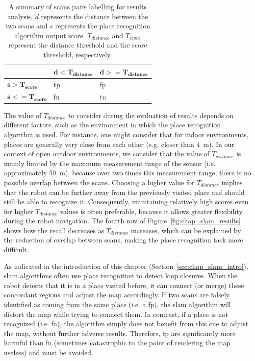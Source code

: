 \begin{table}
    \centering
    \begin{tabular}{@{}l|ll@{}}
        \toprule
                                  & $\mathbf{d < T_{distance}}$ & $\mathbf{d >= T_{distance}}$ \\
        \hline
        $\mathbf{s > T_{score}}$  & \gls*{tp}                   & \gls*{fp} \\
        $\mathbf{s <= T_{score}}$ & \gls*{fn}                   & \gls*{tn} \\
        \bottomrule
    \end{tabular}
    \caption[Summary of scans pairs labelling for results analysis.]{A summary of scans pairs labelling for results analysis. $d$ represents the distance between the two scans and $s$ represents the place recognition algorithm output score. $T_{distance}$ and $T_{score}$ represent the distance threshold and the score threshold, respectively.}
    \label{tab:chap_slam_results_labeling}
\end{table}

The value of $T_{distance}$ to consider during the evaluation of results depends on different factors, such as the environment in which the place recognition algorithm is used. For instance, one might consider that for indoor environments, places are generally very close from each other (e.g. closer than \SI{4}{\meter}). In our context of open outdoor environments, we consider that the value of $T_{distance}$ is mainly limited by the maximum measurement range of the sensor (i.e. approximately \SI{50}{\meter}), because over two times this measurement range, there is no possible overlap between the scans. Choosing a higher value for $T_{distance}$ implies that the robot can be further away from the previously visited place and should still be able to recognize it. Consequently, maintaining relatively high scores even for higher $T_{distance}$ values is often preferable, because it allows greater flexibility during the robot navigation. The fourth row of Figure~\ref{fig:chap_slam_results} shows how the recall decreases as $T_{distance}$ increases, which can be explained by the reduction of overlap between scans, making the place recognition task more difficult.

As indicated in the introduction of this chapter (Section~\ref{sec:chap_slam_intro}), \gls*{slam} algorithms often use place recognition to detect loop closures. When the robot detects that it is in a place visited before, it can connect (or merge) these concordant regions and adjust the map accordingly. If two scans are falsely identified as coming from the same place (i.e. a \gls*{fp}), the \gls*{slam} algorithm will distort the map while trying to connect them. In contrast, if a place is not recognized (i.e. \gls*{fn}), the algorithm simply does not benefit from this cue to adjust the map, without further adverse results. Therefore, \gls*{fp} are significantly more harmful than \gls*{fn} (sometimes catastrophic to the point of rendering the map useless) and must be avoided. 

